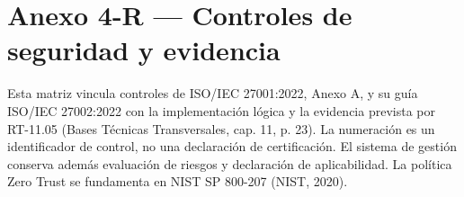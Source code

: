 \clearpage
\section*{Anexo 4-R — Controles de seguridad y evidencia}
\label{fuente-21-anexo-4-1-r-controles-seguridad}
\label{anx:R}
Esta matriz vincula controles de ISO/\allowbreak IEC 27001:2022, Anexo A, y su guía ISO/\allowbreak IEC 27002:2022 con la implementación lógica y la evidencia prevista por RT-11.05 (Bases Técnicas Transversales, cap. 11, p. 23). La numeración es un identificador de control, no una declaración de certificación. El sistema de gestión conserva además evaluación de riesgos y declaración de aplicabilidad. La política Zero Trust se fundamenta en NIST SP 800-207 (NIST, 2020).

